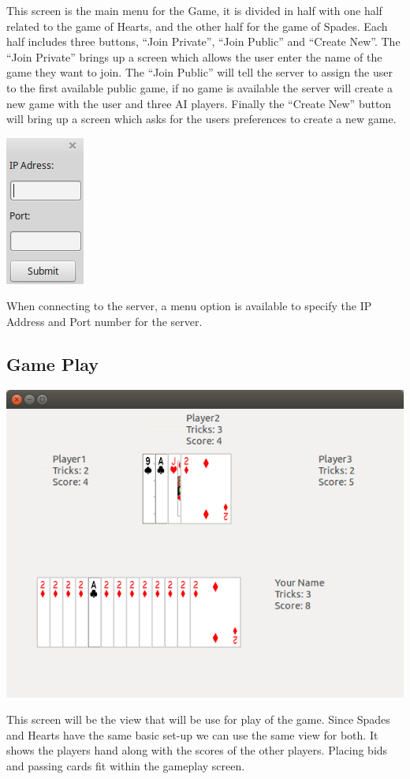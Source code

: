 \documentclass[]{scrartcl}
\begin{document}
This screen is the main menu for the Game, it is divided in half with one half related to the game of Hearts, and the other half for the game of Spades.  Each half includes three buttons, “Join Private”, “Join Public” and “Create New”.  The “Join Private” brings up a screen which allows the user enter the name of the game they want to join.  The “Join Public” will tell the server to assign the user to the first available  public game, if no game is available the server will create a new game with the user and three AI players.  Finally the “Create New” button will bring up a screen which asks for the users preferences to create a new game.

\centerline{\includegraphics{ServerSelection.png}}

When connecting to the server, a menu option is available to specify the IP Address and Port number for the server.


\subsection{Game Play}
\centerline{\includegraphics{game_board.png}}
This screen will be the view that will be use for play of the game. Since Spades and Hearts have the same basic set-up we can use the same view for both. It shows the players hand along with the scores of the other players. Placing bids and passing cards fit within the gameplay screen.
\end{document}
